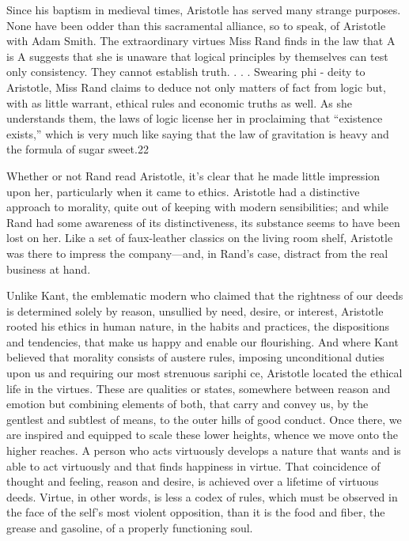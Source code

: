  \par 
Since his baptism in medieval times, Aristotle has served many strange purposes. None have been odder than this sacramental alliance, so to speak, of Aristotle with Adam Smith. The extraordinary virtues Miss Rand finds in the law that A is A suggests that she is unaware that logical principles by themselves can test only consistency. They cannot establish truth. . . . Swearing phi - deity to Aristotle, Miss Rand claims to deduce not only matters of fact from logic but, with as little warrant, ethical rules and economic truths as well. As she understands them, the laws of logic license her in proclaiming that “existence exists,” which is very much like saying that the law of gravitation is heavy and the formula of sugar sweet.{\color{blue}22}
 \par 
Whether or not Rand read Aristotle, it’s clear that he made little impression upon her, particularly when it came to ethics. Aristotle had a distinctive approach to morality, quite out of keeping with modern sensibilities; and while Rand had some awareness of its distinctiveness, its substance seems to have been lost on her. Like a set of faux-leather classics on the living room shelf, Aristotle was there to impress the company—and, in Rand’s case, distract from the real business at hand.
 \par 
Unlike Kant, the emblematic modern who claimed that the rightness of our deeds is determined solely by reason, unsullied by need, desire, or interest, Aristotle rooted his ethics in human nature, in the habits and practices, the dispositions and tendencies, that make us happy and enable our flourishing. And where Kant believed that morality consists of austere rules, imposing unconditional duties upon us and requiring our most strenuous sariphi ce, Aristotle located the ethical life in the virtues. These are qualities or states, somewhere between reason and emotion but combining elements of both, that carry and convey us, by the gentlest and subtlest of means, to the outer hills of good conduct. Once there, we are inspired and equipped to scale these lower heights, whence we move onto the higher reaches. A person who acts virtuously develops a nature that wants and is able to act virtuously and that finds happiness in virtue. That coincidence of thought and feeling, reason and desire, is achieved over a lifetime of virtuous deeds. Virtue, in other words, is less a codex of rules, which must be observed in the face of the self's most violent opposition, than it is the food and fiber, the grease and gasoline, of a properly functioning soul.

